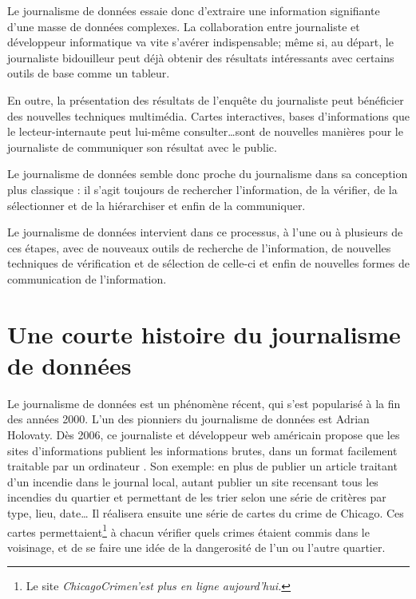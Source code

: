 Le journalisme de données essaie donc d'extraire une information signifiante 
d'une masse de données complexes. La collaboration entre journaliste et développeur 
informatique va vite s'avérer indispensable; même si, au départ, le journaliste \og 
bidouilleur \fg peut déjà obtenir des résultats intéressants avec certains outils de 
base comme un tableur.

En outre, la présentation des résultats de l'enquête du journaliste peut bénéficier 
des nouvelles techniques multimédia. Cartes interactives, bases d'informations
que le lecteur-internaute peut lui-même consulter\dots sont de nouvelles
manières pour le journaliste de communiquer son résultat avec le public. \cite{handbook,bradshaw}

Le journalisme de données semble donc proche du journalisme dans sa conception 
plus classique : il s'agit toujours de rechercher l'information, de la vérifier, 
de la sélectionner et de la hiérarchiser et enfin de la communiquer. 

Le journalisme de données intervient dans ce processus, à l'une ou à plusieurs de ces 
étapes, avec de nouveaux outils de recherche de l'information, de nouvelles 
techniques de vérification et de sélection de celle-ci et enfin de nouvelles 
formes de communication de l'information. \cite{handbook}


\section{Une courte histoire du journalisme de données}

Le journalisme de données est un phénomène récent, qui s'est popularisé à la
fin des années 2000. L'un des pionniers du journalisme de données est Adrian Holovaty. Dès 2006, 
ce journaliste et développeur web américain propose \cite{holovaty} que les sites d'informations publient les informations 
brutes, dans un format facilement traitable par un ordinateur \cite{handbookfr}.
Son exemple: en plus de publier un article traitant d'un incendie dans le 
journal local, autant publier un site recensant tous les incendies du quartier 
et permettant de les trier selon une série de critères par type, lieu, date\dots
Il réalisera ensuite une série de \og cartes du crime \fg de 
Chicago. Ces cartes permettaient\footnote{Le site \em ChicagoCrime\em n'est plus en ligne aujourd'hui.} à chacun vérifier quels crimes étaient commis dans le voisinage, et de se faire une idée de la dangerosité de l'un ou l'autre quartier.


